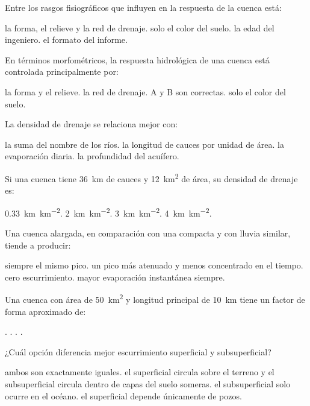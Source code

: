 \begin{questions}
\question[3] Entre los rasgos fisiográficos que influyen en la respuesta
de la cuenca está:
\begin{choices}
  \CorrectChoice la forma, el relieve y la red de drenaje.
  \choice solo el color del suelo.
  \choice la edad del ingeniero.
  \choice el formato del informe.
\end{choices}

\question[3] En términos morfométricos, la respuesta hidrológica de una
cuenca está controlada principalmente por:
\begin{choices}
  \choice la forma y el relieve.
  \choice la red de drenaje.
  \CorrectChoice A y B son correctas.
  \choice solo el color del suelo.
\end{choices}

\question[3] La densidad de drenaje se relaciona mejor con:
\begin{choices}
  \choice la suma del nombre de los ríos.
  \CorrectChoice la longitud de cauces por unidad de área.
  \choice la evaporación diaria.
  \choice la profundidad del acuífero.
\end{choices}

\question[3] Si una cuenca tiene \qty{36}{\kilo\meter} de cauces y
\qty{12}{\kilo\meter\squared} de área, su densidad de drenaje es:
\begin{choices}
  \choice \qty{0.33}{\kilo\meter\per\kilo\meter\squared}.
  \choice \qty{2}{\kilo\meter\per\kilo\meter\squared}.
  \CorrectChoice \qty{3}{\kilo\meter\per\kilo\meter\squared}.
  \choice \qty{4}{\kilo\meter\per\kilo\meter\squared}.
\end{choices}

\question[3] Una cuenca alargada, en comparación con una compacta y con
lluvia similar, tiende a producir:
\begin{choices}
  \choice siempre el mismo pico.
  \CorrectChoice un pico más atenuado y menos concentrado en el tiempo.
  \choice cero escurrimiento.
  \choice mayor evaporación instantánea siempre.
\end{choices}

\question[3] Una cuenca con área de \qty{50}{\kilo\meter\squared} y
longitud principal de \qty{10}{\kilo\meter} tiene un factor de forma
aproximado de:
\begin{choices}
  .
  .
  .
  .
\end{choices}

\question[3] ¿Cuál opción diferencia mejor escurrimiento superficial y
subsuperficial?
\begin{choices}
  \choice ambos son exactamente iguales.
  \CorrectChoice el superficial circula sobre el terreno y el subsuperficial circula dentro de capas del suelo someras.
  \choice el subsuperficial solo ocurre en el océano.
  \choice el superficial depende únicamente de pozos.
\end{choices}


\end{questions}
